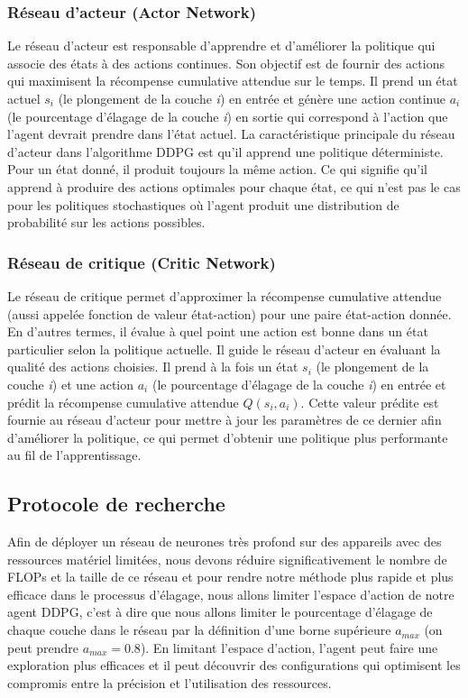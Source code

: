 \subsubsection{Réseau d'acteur (Actor Network)}
Le réseau d'acteur est responsable d'apprendre et d'améliorer la politique qui associe des états à des actions continues. Son objectif est de fournir des actions qui maximisent la récompense cumulative attendue sur le temps. Il prend un état actuel $s_i$ (le plongement de la couche \textit{i}) en entrée et génère une action continue $a_i$ (le pourcentage d'élagage de la couche \textit{i}) en sortie qui correspond à l'action que l'agent devrait prendre dans l'état actuel. La caractéristique principale du réseau d'acteur dans l'algorithme DDPG est qu'il apprend une politique déterministe. Pour un état donné, il produit toujours la même action. Ce qui signifie qu'il apprend à produire des actions optimales pour chaque état, ce qui n'est pas le cas pour les politiques stochastiques où l'agent produit une distribution de probabilité sur les actions possibles.

\subsubsection{Réseau de critique (Critic Network)}
Le réseau de critique permet d'approximer la récompense cumulative attendue (aussi appelée fonction de valeur état-action) pour une paire état-action donnée. En d'autres termes, il évalue à quel point une action est bonne dans un état particulier selon la politique actuelle. Il guide le réseau d'acteur en évaluant la qualité des actions choisies. Il prend à la fois un état $s_i$ (le plongement de la couche \textit{i}) et une action $a_i$ (le pourcentage d'élagage de la couche \textit{i}) en entrée et prédit la récompense cumulative attendue $Q(s_i, a_i)$. Cette valeur prédite est fournie au réseau d'acteur pour mettre à jour les paramètres de ce dernier afin d'améliorer la politique, ce qui permet d'obtenir une politique plus performante au fil de l'apprentissage.

\subsection{Protocole de recherche}
Afin de déployer un réseau de neurones très profond sur des appareils avec des ressources matériel limitées, nous devons réduire significativement le nombre de FLOPs et la taille de ce réseau et pour rendre notre méthode plus rapide et plus efficace dans le processus d'élagage, nous allons limiter l’espace d’action de notre agent DDPG, c'est à dire que nous allons limiter le pourcentage d'élagage de chaque couche dans le réseau par la définition d'une borne supérieure $a_{max}$ (on peut prendre $a_{max} = 0.8$). En limitant l'espace d'action, l'agent peut faire une exploration plus efficaces et il peut découvrir des configurations qui optimisent les compromis entre la précision et l'utilisation des ressources.

